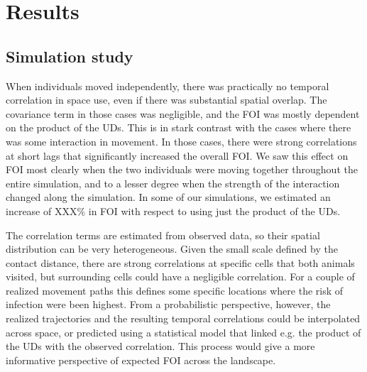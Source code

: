 \documentclass[letterpaper]{article}
\begin{document}
\section*{Results}

\subsection*{Simulation study}

When individuals moved independently, there was practically no temporal correlation in space use, even if there was substantial spatial overlap. The covariance term in those cases was negligible, and the FOI was mostly dependent on the product of the UDs.
This is in stark contrast with the cases where there was some interaction in movement. 
In those cases, there were strong correlations at short lags that significantly increased the overall FOI. 
We saw this effect on FOI most clearly when the two individuals were moving together throughout the entire simulation, and to a lesser degree when the strength of the interaction changed along the simulation.
In some of our simulations, we estimated an increase of XXX\% in FOI with respect to using just the product of the UDs.

The correlation terms are estimated from observed data, so their spatial distribution can be very heterogeneous. Given the small scale defined by the contact distance, there are strong correlations at  specific cells that both animals visited, but surrounding cells could have a negligible correlation. 
For a couple of realized movement paths this defines some specific locations where the risk of infection were been highest. From a probabilistic perspective, however, the realized trajectories and the resulting temporal correlations could be interpolated across space, or predicted using a statistical model that linked e.g. the product of the UDs with the observed correlation. This process would give a more informative perspective of expected FOI across the landscape. 


\end{document}
